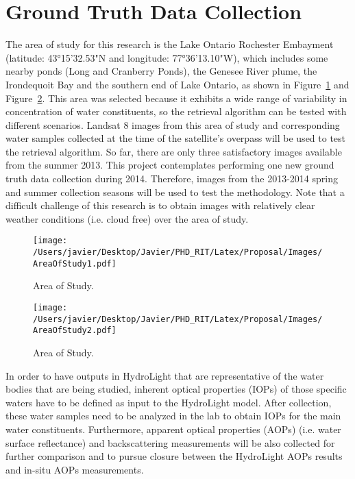 \section{Ground Truth Data Collection}
The area of study for this research is the Lake Ontario Rochester Embayment (latitude: 43°15'32.53"N and longitude: 77°36'13.10"W), which includes some nearby ponds (Long and Cranberry Ponds), the Genesee River plume, the Irondequoit Bay and the southern end of Lake Ontario, as shown in Figure~\ref{fig:areaofstudy1} and Figure~\ref{fig:areaofstudy2}. This area was selected because it exhibits a wide range of variability in concentration of water constituents, so the retrieval algorithm can be tested with different scenarios. Landsat 8 images from this area of study and corresponding water samples collected at the time of the satellite's overpass will be used to test the retrieval algorithm. So far, there are only three satisfactory images available from the summer 2013. This project contemplates performing one new ground truth data collection during 2014. Therefore, images from the 2013-2014 spring and summer collection seasons will be used to test the methodology. Note that a difficult challenge of this research is to obtain images with relatively clear weather conditions (i.e. cloud free) over the area of study.
\begin{figure}[htb]
  \centering
  \texttt{[image: /Users/javier/Desktop/Javier/PHD\_RIT/Latex/Proposal/Images/AreaOfStudy1.pdf]}
  \caption{Area of Study. \label{fig:areaofstudy1} } 
\end{figure}
\begin{figure}[htb]
  \centering
  \texttt{[image: /Users/javier/Desktop/Javier/PHD\_RIT/Latex/Proposal/Images/AreaOfStudy2.pdf]}
  \caption{Area of Study. \label{fig:areaofstudy2} } 
\end{figure}

In order to have outputs in HydroLight that are representative of the water bodies that are being studied, inherent optical properties (IOPs) of those specific waters have to be defined as input to the HydroLight model. After collection, these water samples need to be analyzed in the lab to obtain IOPs for the main water constituents. Furthermore, apparent optical properties (AOPs) (i.e. water surface reflectance) and backscattering measurements will be also collected for further comparison and to pursue closure between the HydroLight AOPs results and in-situ AOPs measurements.

